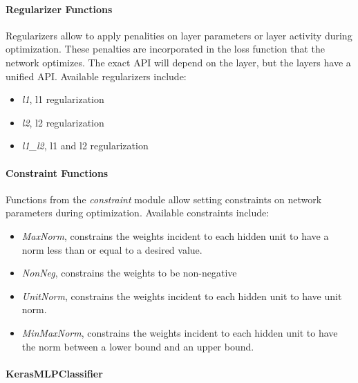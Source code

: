 \paragraph{Regularizer Functions}
\label{regularizersDNN}
Regularizers allow to apply penalities on layer parameters or layer activity during optimization.
These penalties are incorporated in the loss function that the network optimizes. The exact API
will depend on the layer, but the layers  have a
unified API.
Available regularizers include:
\begin{itemize}
  \item \textit{l1}, l1 regularization
  \item \textit{l2}, l2 regularization
  \item \textit{l1\_l2}, l1 and l2 regularization
\end{itemize}

\paragraph{Constraint Functions}
\label{constraintsDNN}
Functions from the \textit{constraint} module allow setting constraints on network parameters during optimization.
Available constraints include:
\begin{itemize}
  \item \textit{MaxNorm}, constrains the weights incident to each hidden unit to have a norm less than or equal to
    a desired value.
  \item \textit{NonNeg}, constrains the weights to be non-negative
  \item \textit{UnitNorm}, constrains the weights incident to each hidden unit to have unit norm.
  \item \textit{MinMaxNorm}, constrains the weights incident to each hidden unit to have the norm between a lower bound
    and an upper bound.
\end{itemize}

\paragraph{KerasMLPClassifier}
\label{KerasMLPClassifier}

